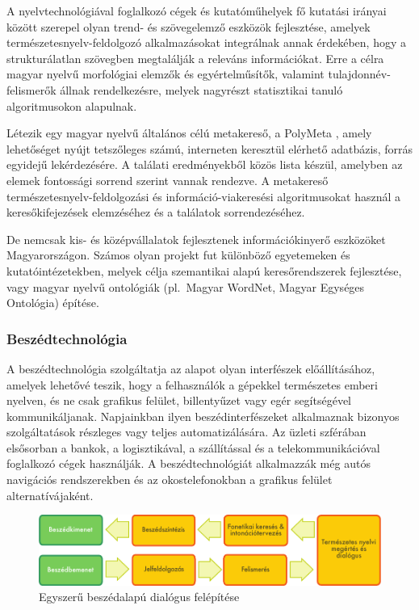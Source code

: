 \begin{multicols}{2}
A nyelvtechnológiával foglalkozó cégek és kutatóműhelyek fő kutatási irányai között szerepel olyan trend- és szövegelemző esz\-kö\-zök fejlesztése, amelyek ter\-mé\-sze\-tes\-nyelv-feldolgozó alkalmazásokat integrálnak annak érdekében, hogy a strukturálatlan szövegben megtalálják a releváns információkat. Erre a célra magyar nyelvű morfológiai elemzők és egyértelműsítők, valamint tulajdonnév-felismerők állnak rendelkezésre, melyek nagyrészt statisztikai tanuló algoritmusokon alapulnak.

Létezik egy magyar nyelvű általános célú metakereső, a PolyMeta \cite{polymeta}, amely le\-he\-tő\-sé\-get nyújt tetszőleges számú, interneten keresztül elérhető adatbázis, forrás egyidejű lekérdezésére. A találati eredményekből közös lista készül, amelyben az elemek fontossági sorrend szerint vannak rendezve. A metakereső természetesnyelv-feldolgozási és információ-viakeresési algoritmusokat használ a keresőkifejezések elemzéséhez és a találatok sorrendezéséhez.

De nemcsak kis- és középvállalatok fej\-lesz\-te\-nek információkinyerő eszközöket Magyarországon. Számos olyan projekt fut különböző egyetemeken és kutatóintézetekben, melyek célja szemantikai alapú keresőrendszerek fejlesztése, vagy magyar nyelvű ontológiák (pl.~Ma\-gyar WordNet, Magyar Egységes Ontológia) építése. 

\subsubsection{Beszédtechnológia}

A beszédtechnológia szolgáltatja az alapot olyan interfészek előállításához, amelyek lehetővé teszik, hogy a felhasználók a gépekkel természetes emberi nyelven, és ne csak grafikus felület, billentyűzet vagy egér segítségével kommunikáljanak. Napjainkban ilyen beszédinterfészeket al\-kal\-maz\-nak bizonyos szolgáltatások részleges vagy teljes automatizálására. Az üzleti szférában elsősorban a bankok, a logisztikával, a szállítással és a telekommunikációval foglalkozó cégek használják. A beszédtechnológiát alkalmazzák még autós navigációs rendszerekben és az okostelefonokban a grafikus felület alternatívájaként.

\begin{figure}[htb]
  \center 
  \includegraphics[width=\textwidth]{../_media/hungarian/simple_speech-based_dialogue_architecture}
  \caption{Egyszerű beszédalapú dialógus felépítése}
  \label{fig:dialoguearch_de}
\end{figure}


\end{multicols}
